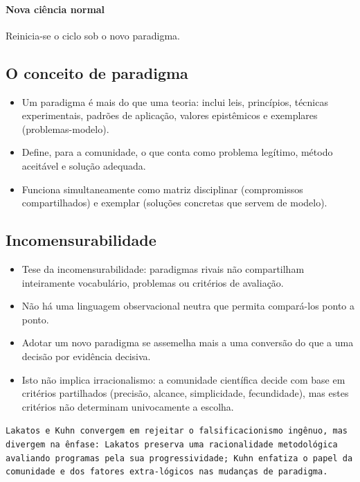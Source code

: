 \documentclass[9pt,a4paper]{extarticle}
\newcommand{\impt}[1]{\textcolor{important}{#1}}
\newcommand{\ntc}[1]{\textcolor{notice}{#1}}
\begin{document}
\paragraph{Nova ciência normal} 

Reinicia-se o ciclo sob o novo paradigma.

\subsection{O conceito de paradigma}

\begin{itemize}
    \item Um paradigma é mais do que uma teoria: inclui leis, princípios, técnicas experimentais, padrões de aplicação, valores epistêmicos e exemplares (problemas-modelo).
    \item Define, para a comunidade, \impt{o que conta como problema legítimo, método aceitável e solução adequada}.
    \item Funciona simultaneamente como \ntc{matriz disciplinar} (compromissos compartilhados) e \ntc{exemplar} (soluções concretas que servem de modelo).
\end{itemize}

\subsection{Incomensurabilidade}

\begin{itemize}
    \item \impt{Tese da incomensurabilidade}: paradigmas rivais não compartilham inteiramente vocabulário, problemas ou critérios de avaliação.
    \item Não há uma linguagem observacional neutra que permita compará-los ponto a ponto.
    \item Adotar um novo paradigma se assemelha mais a uma \ntc{conversão} do que a uma decisão por evidência decisiva.
    \item Isto não implica irracionalismo: a comunidade científica decide com base em critérios partilhados (precisão, alcance, simplicidade, fecundidade), mas estes critérios não determinam univocamente a escolha.
\end{itemize}

\texttt{Lakatos e Kuhn convergem em rejeitar o falsificacionismo ingênuo, mas divergem na ênfase: Lakatos preserva uma racionalidade metodológica avaliando programas pela sua progressividade; Kuhn enfatiza o papel da comunidade e dos fatores extra-lógicos nas mudanças de paradigma.}
\end{document}
